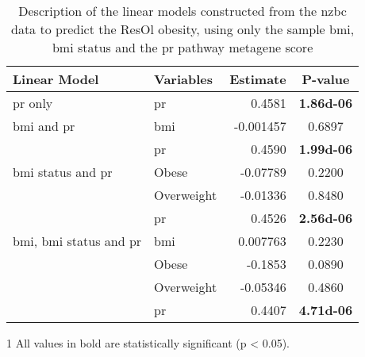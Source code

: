 	\begin{table}[htpb]
		\centering
		\caption[Description of the linear models constructed from the \gls{nzbc} data to predict the ResOl obesity, using only the sample \gls{bmi}, \gls{bmi} status and the \acrshort{pr} pathway metagene score]{Description of the linear models constructed from the \gls{nzbc} data to predict the ResOl obesity, using only the sample \gls{bmi}, \gls{bmi} status and the \gls{pr} pathway metagene score}
		\label{tab:lm_pr_only_resol}
		\begin{threeparttable}
			\begin{tabular}{llrc}
				Linear Model & Variables & Estimate & {P-value}\\
					\hline
					\hline
					\rule{0pt}{2.25ex}\gls{pr} only                            & \gls{pr}   & 0.4581    & \bfseries \num{1.86d-06} \tnote{1}\\
					\hline
					\rule{0pt}{2.25ex}\gls{bmi} and \gls{pr}                   & \gls{bmi}  & -0.001457 & 0.6897   \\
                                                                               & \gls{pr}   & 0.4590    & \bfseries \num{1.99d-06} \\
					\hline
					\rule{0pt}{2.25ex}\gls{bmi} status and \gls{pr}            & Obese      & -0.07789  & 0.2200   \\
                                                                               & Overweight & -0.01336  & 0.8480   \\
                                                                               & \gls{pr}   & 0.4526    & \bfseries \num{2.56d-06} \\
					\hline
					\rule{0pt}{2.25ex}\gls{bmi}, \gls{bmi} status and \gls{pr} & \gls{bmi}  & 0.007763  & 0.2230   \\
                                                                               & Obese      & -0.1853   & 0.0890   \\
                                                                               & Overweight & -0.05346  & 0.4860   \\
                                                                               & \gls{pr}   & 0.4407    & \bfseries \num{4.71d-06} \\
					\hline
					\hline
			\end{tabular}
				\begin{tablenotes}
					\begin{footnotesize}
					\item [1] All values in bold are statistically significant (p \textless{} 0.05).
					\end{footnotesize}
				\end{tablenotes}
		\end{threeparttable}
	\end{table}

